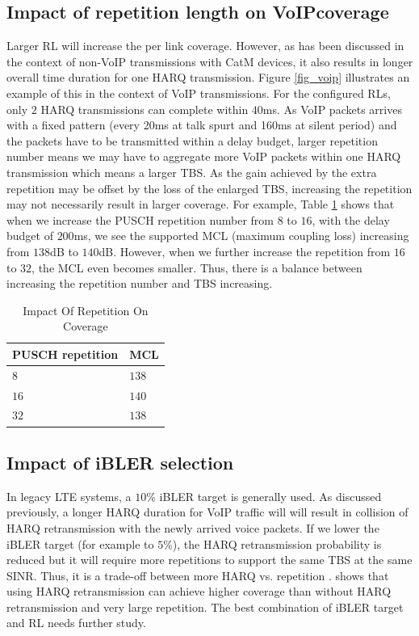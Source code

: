 \documentclass[conference,compsoc]{IEEEtran}
\begin{document}
\subsection{Impact of repetition length on VoIPcoverage}
Larger RL will increase the per link coverage. However, as has been discussed in the context of non-VoIP transmissions with CatM devices, it also results in longer overall time duration for one HARQ transmission. Figure \ref{fig_voip} illustrates an example of this in the context of VoIP transmissions. For the configured RLs, only $2$ HARQ transmissions can complete within $40$ms. As VoIP packets arrives with a fixed pattern (every 20ms at talk spurt and 160ms at silent period) and the packets have to be transmitted within a delay budget, larger repetition number means we may have to aggregate more VoIP packets within one HARQ transmission which means a larger TBS. As the gain achieved by the extra repetition may be offset by the loss of the enlarged TBS, increasing the repetition may not necessarily result in larger coverage. For example, Table \ref{table_mcl} shows that when we increase the PUSCH repetition number from $8$ to $16$, with the delay budget of $200$ms, we see the supported MCL (maximum coupling loss) increasing from $138$dB to $140$dB. However, when we further increase the repetition from $16$ to $32$, the MCL even becomes smaller.  Thus, there is a balance between increasing the repetition number and TBS increasing.
\begin{table}
    \centering
    \begin{tabular}{|l|l|}
    \hline
        {\bf PUSCH repetition} & {\bf MCL} \\ 
        \hline
    \hline
        $8$	& $138$ \\
        \hline
        $16$	& $140$ \\
        \hline
        $32$	& $138$ \\
    \hline
\end{tabular}
    \label{table_mcl}
    \caption{Impact Of Repetition On Coverage}
\end{table}


\subsection{Impact of iBLER selection}
In legacy LTE systems, a $10$\% iBLER target is generally used. As discussed previously, a longer HARQ duration for VoIP traffic will will result in collision of HARQ retransmission with the newly arrived voice packets. If we lower the iBLER target (for example to $5$\%), the HARQ retransmission probability is reduced but it will require more repetitions to support the same TBS at the same SINR. Thus, it is a trade-off between more HARQ vs. repetition  . \cite{volte} shows that using HARQ retransmission can achieve higher coverage than without HARQ retransmission and very large repetition. The best combination of iBLER target and RL needs further study.
\end{document}
